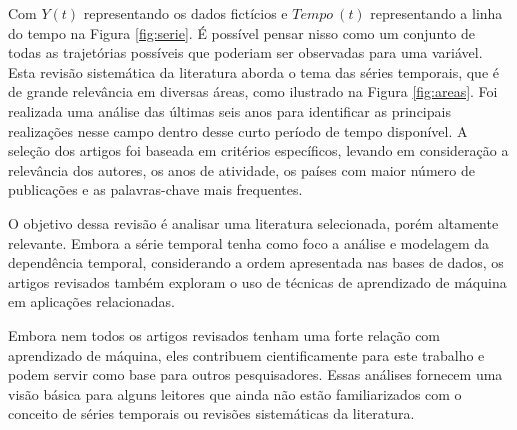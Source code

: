 

Com $Y(t)$ representando os dados fictícios e $Tempo \ (t)$ representando a linha do tempo na Figura \ref{fig:serie}.
É possível pensar nisso como um conjunto de todas as trajetórias possíveis que poderiam ser observadas para uma variável.
Esta revisão sistemática da literatura aborda o tema das séries temporais, que é de grande relevância em diversas áreas, como ilustrado na Figura \ref{fig:areas}. Foi realizada uma análise das últimas seis anos para identificar as principais realizações nesse campo dentro desse curto período de tempo disponível. A seleção dos artigos foi baseada
em critérios específicos, levando em consideração a relevância dos autores, os anos de atividade, os países com maior número de publicações e as palavras-chave mais frequentes.

O objetivo dessa revisão é analisar uma literatura selecionada, porém altamente relevante. Embora a série temporal tenha como foco a análise e modelagem da dependência temporal, considerando a ordem apresentada nas bases de dados, os artigos revisados também exploram o uso de técnicas de aprendizado de máquina em aplicações relacionadas.

Embora nem todos os artigos revisados tenham uma forte relação com aprendizado de máquina, eles contribuem cientificamente para este trabalho e podem servir como base para outros pesquisadores. Essas análises fornecem uma visão básica para alguns leitores que ainda não estão familiarizados com o conceito de séries temporais ou revisões sistemáticas da literatura.
